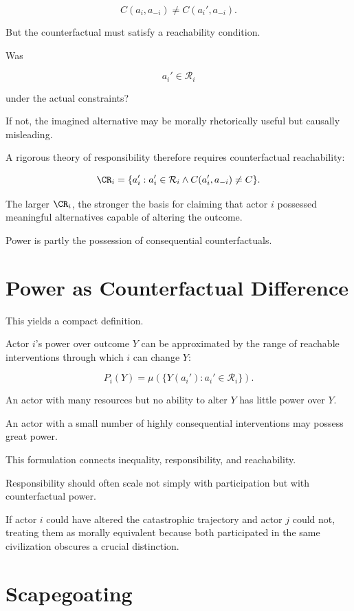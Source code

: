 \documentclass[11pt,oneside]{book}
\theoremstyle{definition}
\theoremstyle{remark}
\newcommand{\R}{\mathcal{R}}
\begin{document}
\[
C(a_i,a_{-i})
\neq
C(a_i',a_{-i}).
\]

But the counterfactual must satisfy a reachability condition.

Was

\[
a_i'\in\R_i
\]

under the actual constraints?

If not, the imagined alternative may be morally rhetorically useful but causally misleading.

A rigorous theory of responsibility therefore requires counterfactual reachability:

\[
\CR_i
=
\{
a_i':
a_i'\in\R_i
\land
C(a_i',a_{-i})\neq C
\}.
\]

The larger \(\CR_i\), the stronger the basis for claiming that actor \(i\) possessed meaningful alternatives capable of altering the outcome.

Power is partly the possession of consequential counterfactuals.

\section{Power as Counterfactual Difference}

This yields a compact definition.

Actor \(i\)'s power over outcome \(Y\) can be approximated by the range of reachable interventions through which \(i\) can change \(Y\):

\[
P_i(Y)
=
\mu
\left(
\{
Y(a_i'):
a_i'\in\R_i
\}
\right).
\]

An actor with many resources but no ability to alter \(Y\) has little power over \(Y\).

An actor with a small number of highly consequential interventions may possess great power.

This formulation connects inequality, responsibility, and reachability.

Responsibility should often scale not simply with participation but with counterfactual power.

If actor \(i\) could have altered the catastrophic trajectory and actor \(j\) could not, treating them as morally equivalent because both participated in the same civilization obscures a crucial distinction.

\section{Scapegoating}
\end{document}
